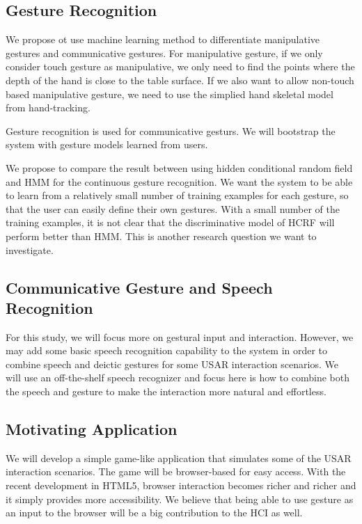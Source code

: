 \subsection{Gesture Recognition}
We propose ot use machine learning method to differentiate
manipulative gestures and communicative gestures. For manipulative gesture, if
we only consider touch gesture as manipulative, we only need to find the points
where the depth of the hand is close to the table surface. If we also want to
allow non-touch based manipulative gesture, we need to use the simplied hand
skeletal model from hand-tracking. 

Gesture recognition is used for communicative
gesturs. We will bootstrap the system with gesture models learned from users.

We propose to compare the result between using hidden conditional random field
and HMM for the continuous gesture recognition. We want the system to be able to
learn from a relatively small number of training examples for each gesture, so
that the user can easily define their own gestures. With a small number of the
training examples, it is not clear that the discriminative model of HCRF will
perform better than HMM. This is another research question we want to
investigate.

\subsection{Communicative Gesture and Speech Recognition} 
For this study, we will focus more on gestural input and interaction. 
However, we may add some basic speech recognition capability to the system in order to combine speech and
deictic gestures for some USAR interaction scenarios. We will use an
off-the-shelf speech recognizer and focus here is how to combine both the speech
and gesture to make the interaction more natural and effortless.

\subsection{Motivating Application}
We will develop a simple game-like application that simulates some of the USAR
interaction scenarios. The game will be browser-based for easy access. With the
recent development in HTML5, browser interaction becomes richer and richer and
it simply provides more accessibility. We believe that being able to use gesture
as an input to the browser will be a big contribution to the HCI as well.

